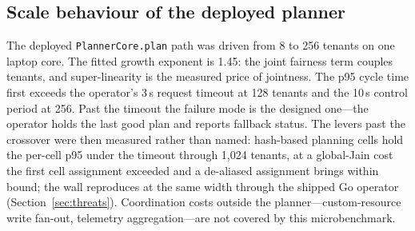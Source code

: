 \subsection{Scale behaviour of the deployed planner}
\label{sec:impl-scaling}

The deployed \texttt{PlannerCore.plan} path was driven from 8 to 256
tenants on one laptop core. The fitted growth exponent is 1.45: the joint
fairness term couples tenants, and super-linearity is the measured price of
jointness. The p95 cycle time first exceeds the operator's 3\,s request
timeout at 128 tenants and the 10\,s control period at 256. Past the
timeout the failure mode is the designed one---the operator holds the last
good plan and reports fallback status. The levers past the crossover were
then measured rather than named: hash-based planning cells hold the
per-cell p95 under the timeout through 1,024 tenants, at a global-Jain
cost the first cell assignment exceeded and a de-aliased assignment brings
within bound; the wall reproduces at the same width through the shipped Go
operator (Section~\ref{sec:threats}). Coordination costs outside the
planner---custom-resource write fan-out, telemetry aggregation---are not
covered by this microbenchmark.

